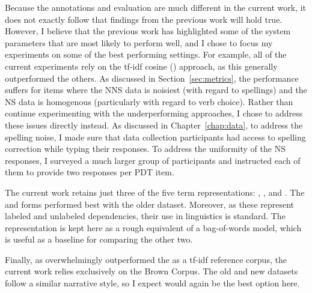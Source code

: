 Because the annotations and evaluation are much different in the current work, it does not exactly follow that findings from the previous work will hold true. However, I believe that the previous work has highlighted some of the system parameters that are most likely to perform well, and I chose to focus my experiments on some of the best performing settings. For example, all of the current experiments rely on the tf-idf cosine () approach, as this generally outperformed the others. As discussed in Section~\ref{sec:metrics}, the  performance suffers for items where the NNS data is noisiest (with regard to spellings) and the NS data is homogenous (particularly with regard to verb choice). Rather than continue experimenting with the underperforming approaches, I chose to address these issues directly instead. As discussed in Chapter~\ref{chap:data}, to address the spelling noise, I made sure that data collection participants had access to spelling correction while typing their responses. To address the uniformity of the NS responses, I surveyed a much larger group of participants and instructed each of them to provide two responses per PDT item.

The current work retains just three of the five term representations: , , and . The  and  forms performed best with the older dataset. Moreover, as these represent labeled and unlabeled dependencies, their use in linguistics is standard. The  representation is kept here as a rough equivalent of a bag-of-words model, which is useful as a baseline for comparing the other two.

Finally, as  overwhelmingly outperformed the  as a tf-idf reference corpus, the current work relies exclusively on the Brown Corpus. The old and new datasets follow a similar narrative style, so I expect  would again be the best option here.

%
